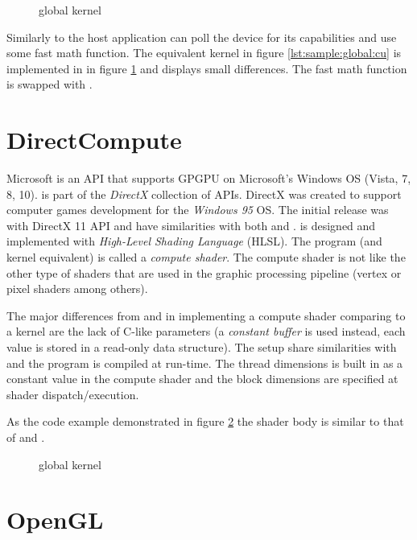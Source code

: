 \begin{figure}
	\centering
	\fbox{}
	\caption{{\OCL} global kernel}
	\label{lst:sample:global:ocl}	
\end{figure}

Similarly to {\CU} the host application can poll the device for its capabilities and use some fast math function. The equivalent {\CU} kernel in figure \ref{lst:sample:global:cu} is implemented in {\OCL} in figure \ref{lst:sample:global:ocl} and displays small differences. The fast math function  is swapped with .

\section{DirectCompute}

Microsoft {\DX} is an API that supports GPGPU on Microsoft's Windows OS (Vista, 7, 8, 10). {\DX} is part of the \emph{DirectX} collection of APIs. DirectX was created to support computer games development for the \emph{Windows 95} OS. The initial release was with DirectX 11 API and have similarities with both {\CU} and {\OCL}. {\DX} is designed and implemented with \emph{High-Level Shading Language} (HLSL). The program (and kernel equivalent) is called a \emph{compute shader}. The compute shader is not like the other type of shaders that are used in the graphic processing pipeline (vertex or pixel shaders among others).

The major differences from {\CU} and {\OCL} in implementing a compute shader comparing to a kernel are the lack of C-like parameters (a \emph{constant buffer} is used instead, each value is stored in a read-only data structure). The setup share similarities with {\OCL} and the program is compiled at run-time. The thread dimensions is built in as a constant value in the compute shader and the block dimensions are specified at shader dispatch/execution.

As the code example demonstrated in figure \ref{lst:sample:global:dx} the shader body is similar to that of {\CU} and {\OCL}.

\begin{figure}
	\centering
	\fbox{}
	\caption{{\DX} global kernel}
	\label{lst:sample:global:dx}	
\end{figure}

\section{OpenGL}

